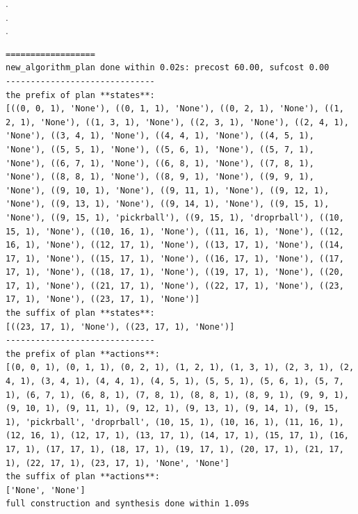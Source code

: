 . \\
. \\
.\\
\begin{lstlisting}
==================
new_algorithm_plan done within 0.02s: precost 60.00, sufcost 0.00
------------------------------
the prefix of plan **states**:
[((0, 0, 1), 'None'), ((0, 1, 1), 'None'), ((0, 2, 1), 'None'), ((1, 2, 1), 'None'), ((1, 3, 1), 'None'), ((2, 3, 1), 'None'), ((2, 4, 1), 'None'), ((3, 4, 1), 'None'), ((4, 4, 1), 'None'), ((4, 5, 1), 'None'), ((5, 5, 1), 'None'), ((5, 6, 1), 'None'), ((5, 7, 1), 'None'), ((6, 7, 1), 'None'), ((6, 8, 1), 'None'), ((7, 8, 1), 'None'), ((8, 8, 1), 'None'), ((8, 9, 1), 'None'), ((9, 9, 1), 'None'), ((9, 10, 1), 'None'), ((9, 11, 1), 'None'), ((9, 12, 1), 'None'), ((9, 13, 1), 'None'), ((9, 14, 1), 'None'), ((9, 15, 1), 'None'), ((9, 15, 1), 'pickrball'), ((9, 15, 1), 'droprball'), ((10, 15, 1), 'None'), ((10, 16, 1), 'None'), ((11, 16, 1), 'None'), ((12, 16, 1), 'None'), ((12, 17, 1), 'None'), ((13, 17, 1), 'None'), ((14, 17, 1), 'None'), ((15, 17, 1), 'None'), ((16, 17, 1), 'None'), ((17, 17, 1), 'None'), ((18, 17, 1), 'None'), ((19, 17, 1), 'None'), ((20, 17, 1), 'None'), ((21, 17, 1), 'None'), ((22, 17, 1), 'None'), ((23, 17, 1), 'None'), ((23, 17, 1), 'None')]
the suffix of plan **states**:
[((23, 17, 1), 'None'), ((23, 17, 1), 'None')]
------------------------------
the prefix of plan **actions**:
[(0, 0, 1), (0, 1, 1), (0, 2, 1), (1, 2, 1), (1, 3, 1), (2, 3, 1), (2, 4, 1), (3, 4, 1), (4, 4, 1), (4, 5, 1), (5, 5, 1), (5, 6, 1), (5, 7, 1), (6, 7, 1), (6, 8, 1), (7, 8, 1), (8, 8, 1), (8, 9, 1), (9, 9, 1), (9, 10, 1), (9, 11, 1), (9, 12, 1), (9, 13, 1), (9, 14, 1), (9, 15, 1), 'pickrball', 'droprball', (10, 15, 1), (10, 16, 1), (11, 16, 1), (12, 16, 1), (12, 17, 1), (13, 17, 1), (14, 17, 1), (15, 17, 1), (16, 17, 1), (17, 17, 1), (18, 17, 1), (19, 17, 1), (20, 17, 1), (21, 17, 1), (22, 17, 1), (23, 17, 1), 'None', 'None']
the suffix of plan **actions**:
['None', 'None']
full construction and synthesis done within 1.09s 
\end{lstlisting}



